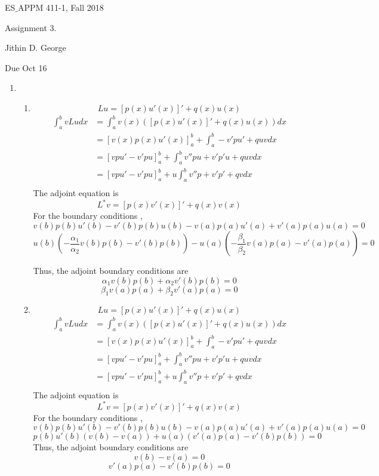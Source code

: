 \documentclass[letterpaper,12pt]{article}
\begin{document}




\noindent
{\scriptsize ES$\_$APPM 411-1, Fall 2018} \hfill

\begin{center}
\large
Assignment 3.
\normalsize

Jithin D. George
\end{center}

\noindent
Due Oct 16
\vspace{.3in}




\noindent


\begin{enumerate}
\item
\begin{enumerate}
\item
\[L u = [p(x)u'(x)]' +q(x)u(x)\]
\begin{align*} \int_a^b v L u  dx & =   \int_a^b v(x) ([p(x)u'(x)]' +q(x)u(x)) dx \\
& = [v(x) p(x)u'(x) ]_a^b+ \int_a^b  - v' p u' + q u v dx \\
& = [v pu'-v'pu ]_a^b+  \int_a^b v'' p u+ v'p'u + q u v dx \\
& = [v pu'-v'pu ]_a^b+ u \int_a^b v'' p + v'p' + q  v dx \\
\end{align*}
The adjoint equation is
\[L^* v = [p(x)v'(x)]' +q(x)v(x)\]
For the boundary conditions ,
\[v(b) p(b)u'(b)-v'(b)p(b)u(b)- v(a) p(a)u'(a)+v'(a)p(a)u(a)=0\]
\[u(b)(-\frac{\alpha_1}{\alpha_2} v(b) p(b)-v'(b)p(b))- u(a)(-\frac{\beta_1}{\beta_2}v(a) p(a)-v'(a)p(a))=0\]

Thus, the adjoint boundary conditions are
\[\alpha_1 v(b) p(b)+\alpha_2 v'(b)p(b)= 0\]
\[\beta_1 v(a) p(a)+ \beta_2 v'(a)p(a) = 0\]
\item
\[L u = [p(x)u'(x)]' +q(x)u(x)\]
\begin{align*} \int_a^b v L u  dx & =   \int_a^b v(x) ([p(x)u'(x)]' +q(x)u(x)) dx \\
& = [v(x) p(x)u'(x) ]_a^b+ \int_a^b  - v' p u' + q u v dx \\
& = [v pu'-v'pu ]_a^b+  \int_a^b v'' p u+ v'p'u + q u v dx \\
& = [v pu'-v'pu ]_a^b+ u \int_a^b v'' p + v'p' + q  v dx \\
\end{align*}
The adjoint equation is
\[L^* v = [p(x)v'(x)]' +q(x)v(x)\]
For the boundary conditions ,
\[v(b) p(b)u'(b)-v'(b)p(b)u(b)- v(a) p(a)u'(a)+v'(a)p(a)u(a)=0\]
\[p(b)u'(b)(v(b)-v(a))+u(a)(v'(a)p(a)-v'(b)p(b))=0\]
Thus, the adjoint boundary conditions are
\[v(b)-v(a) =0 \]
\[v'(a)p(a)-v'(b)p(b) =0 \]


\end{enumerate}
\end{enumerate}
\end{document}
